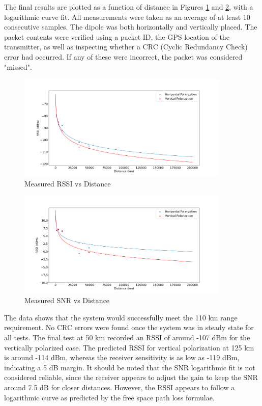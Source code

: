 The final results are plotted as a function of distance in Figures \ref{fig:rangeRssi} and \ref{fig:rangeSnr}, with a logarithmic curve fit. All measurements were taken as an average of at least 10 consecutive samples. The dipole was both horizontally and vertically placed. The packet contents were verified using a packet ID, the GPS location of the transmitter, as well as inspecting whether a CRC (Cyclic Redundancy Check) error had occurred. If any of these were incorrect, the packet was considered "missed".

\begin{figure}[!htb]
  \centering
  \includegraphics[width=0.9\textwidth]{rangeRssi}
  \caption{Measured RSSI vs Distance}
  \label{fig:rangeRssi}
\end{figure}

\begin{figure}[!htb]
  \centering
  \includegraphics[width=0.9\textwidth]{rangeSnr}
  \caption{Measured SNR vs Distance}
  \label{fig:rangeSnr}
\end{figure}

The data shows that the system would successfully meet the 110 km range requirement. No CRC errors were found once the system was in steady state for all tests. The final test at 50 km recorded an RSSI of around -107 dBm for the vertically polarized case. The predicted RSSI for vertical polarization at 125 km is around -114 dBm, whereas the receiver sensitivity is as low as -119 dBm, indicating a 5 dB margin. It should be noted that the SNR logarithmic fit is not considered reliable, since the receiver appears to adjust the gain to keep the SNR around 7.5 dB for closer distances. However, the RSSI appears to follow a logarithmic curve as predicted by the free space path loss formulae.